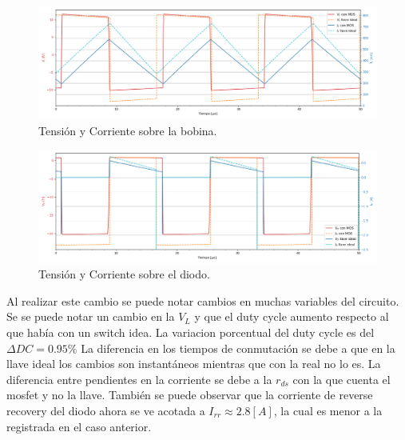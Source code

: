 \begin{multicols}{2}
\begin{figure}[H]
	\centering
	\includegraphics[width=0.9\linewidth]{ImagenesEjercicio-3/il-vl-2v3}
	\caption{Tensión y Corriente sobre la bobina.}
	\label{fig:ej3:Il_Vl}
\end{figure}
\begin{figure}[H]
	\centering
	\includegraphics[width=0.9\linewidth]{ImagenesEjercicio-3/id-vd-2v3}
	\caption{Tensión y Corriente sobre el diodo.}
	\label{fig:ej3:Id_Vd}
\end{figure}
\end{multicols}
Al realizar este cambio se puede notar cambios en muchas variables del circuito.
Se  se puede notar un cambio en la $V_L$ y que el duty cycle aumento respecto al que había con un switch idea.
La variacion porcentual del duty cycle es del $\Delta DC  =0.95 \% $
La diferencia en los tiempos de conmutación se debe a que en la llave ideal los cambios son instantáneos mientras que con la real no lo es.
La diferencia entre pendientes en la corriente se debe a la $r_{ds}$ con la que cuenta el mosfet y no la llave. 
También se puede observar que la corriente de reverse recovery del diodo ahora se ve acotada a $I_{rr}\approx 2.8[A]$, la cual es menor a la registrada en el caso anterior.

